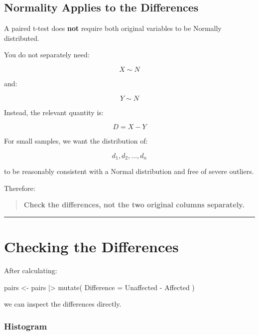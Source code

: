 \documentclass[
  letterpaper,
  DIV=11,
  numbers=noendperiod]{scrreprt}
\newenvironment{Shaded}{\begin{snugshade}}{\end{snugshade}}
\newcommand{\AttributeTok}[1]{\textcolor[rgb]{0.40,0.45,0.13}{#1}}
\newcommand{\FunctionTok}[1]{\textcolor[rgb]{0.28,0.35,0.67}{#1}}
\newcommand{\NormalTok}[1]{\textcolor[rgb]{0.00,0.23,0.31}{#1}}
\newcommand{\OtherTok}[1]{\textcolor[rgb]{0.00,0.23,0.31}{#1}}
\newcommand{\SpecialCharTok}[1]{\textcolor[rgb]{0.37,0.37,0.37}{#1}}
\begin{document}
\section{Normality Applies to the
Differences}\label{normality-applies-to-the-differences}

A paired t-test does \textbf{not} require both original variables to be
Normally distributed.

You do not separately need:

\[
X\sim N
\]

and:

\[
Y\sim N
\]

Instead, the relevant quantity is:

\[
D=X-Y
\]

For small samples, we want the distribution of:

\[
d_1,d_2,\ldots,d_n
\]

to be reasonably consistent with a Normal distribution and free of
severe outliers.

Therefore:

\begin{quote}
\textbf{Check the differences, not the two original columns separately.}
\end{quote}

\begin{center}\rule{0.5\linewidth}{0.5pt}\end{center}


\chapter{Checking the Differences}\label{checking-the-differences}

After calculating:

\begin{Shaded}
\begin{Highlighting}[]
\NormalTok{pairs }\OtherTok{\textless{}{-}}\NormalTok{ pairs }\SpecialCharTok{|\textgreater{}}
    \FunctionTok{mutate}\NormalTok{(}
        \AttributeTok{Difference =}\NormalTok{ Unaffected }\SpecialCharTok{{-}}\NormalTok{ Affected}
\NormalTok{    )}
\end{Highlighting}
\end{Shaded}

we can inspect the differences directly.

\subsection{Histogram}\label{histogram}
\end{document}

